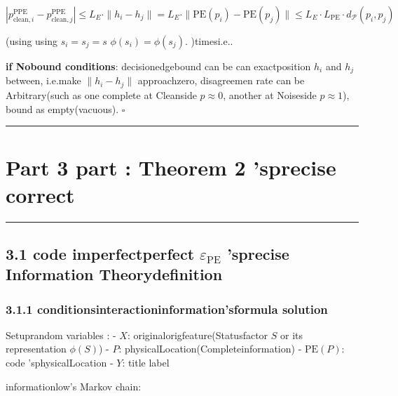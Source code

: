 \documentclass[
  12pt,
]{article}
\begin{document}
\[|p_{\text{clean}, i}^{\text{PPE}} - p_{\text{clean}, j}^{\text{PPE}}| \leq L_E \cdot \|h_i - h_j\| = L_E \cdot \|\text{PE}(p_i) - \text{PE}(p_j)\| \leq L_E \cdot L_{\text{PE}} \cdot d_{\mathcal{P}}(p_i, p_j)\]

(using using  \(s_i = s_j = s\)  \(\phi(s_i) = \phi(s_j)\). )timesi.e.. 

\textbf{if Nobound conditions}: decisionedgebound can be can exactposition \(h_i\) and  \(h_j\)
between, i.e.make  \(\|h_i - h_j\|\)
approachzero, disagreemen rate can be Arbitrary(such as one complete at Cleanside
\(p \approx 0\), another at Noiseside
\(p \approx 1\)), bound as empty(vacuous). \(\square\)

\begin{center}\rule{0.5\linewidth}{0.5pt}\end{center}

\section{Part 3 part : Theorem 2
'sprecise correct }\label{ux7b2c-3-ux90e8ux5206theorem-2-ux7684ux7cbeux786eux4feeux6b63}

\begin{center}\rule{0.5\linewidth}{0.5pt}\end{center}

\subsection{\texorpdfstring{3.1 code imperfectperfect \(\varepsilon_{\text{PE}}\)
'sprecise Information Theorydefinition }{3.1 code imperfectperfect \textbackslash varepsilon\_\{\textbackslash text\{PE\}\} 'sprecise Information Theorydefinition }}\label{ux7f16ux7801ux4e0dux5b8cux7f8eux5ea6-varepsilon_textpe-ux7684ux7cbeux786eux4fe1ux606fux8bbaux5b9aux4e49}

\subsubsection{3.1.1
conditionsinteractioninformation'sformula solution}\label{ux6761ux4ef6ux4e92ux4fe1ux606fux7684ux94feux5f0fux5206ux89e3}

Setuprandom variables :  - \(X\): originalorigfeature(Statusfactor  \(S\) or its representation \(\phi(S)\)) -
\(P\): physicalLocation(Completeinformation) - \(\text{PE}(P)\): code 'sphysicalLocation -
\(Y\): title label

informationlow's Markov chain: 
\end{document}
